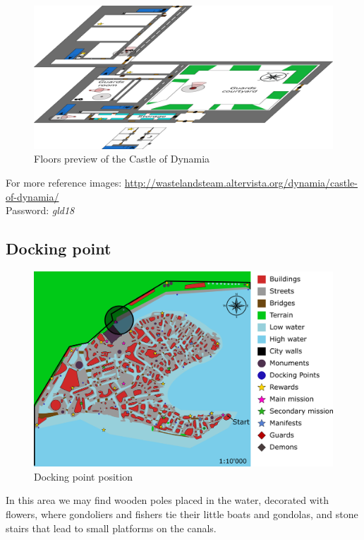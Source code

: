 \begin{figure}[H]
  \centering
  \includegraphics[width=\textwidth]{Images/Maps/castleOfDynamiaFloorsPreview}
  \caption{Floors preview of the Castle of Dynamia}
\end{figure}

For more reference images: \url{http://wastelandsteam.altervista.org/dynamia/castle-of-dynamia/}\\
Password: \textit{gld18}

\subsection{Docking point}
\begin{figure}[H]
  \centering
  \includegraphics[width=\textwidth]{Images/Maps/dynamia_dockingPoint}
  \caption{Docking point position}
\end{figure}
  
In this area we may find wooden poles placed in the water, decorated with flowers, where gondoliers and fishers tie their little boats and gondolas, and  stone stairs that lead to small platforms on the canals.

